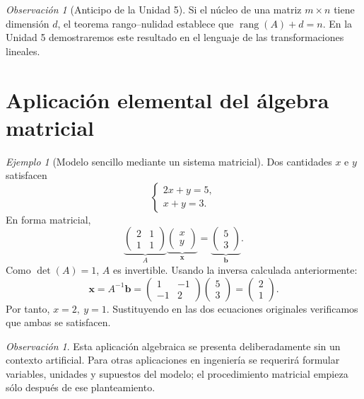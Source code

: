 \documentclass[12pt]{article}
\theoremstyle{remark}
\newtheorem{observacion}[definicion]{Observación}
\newtheorem{ejemplo}[definicion]{Ejemplo}
\newcommand{\rang}{\operatorname{rang}}
\newcommand{\vect}[1]{\boldsymbol{#1}}
\begin{document}
\begin{observacion}[Anticipo de la Unidad 5]
Si el núcleo de una matriz $m\times n$ tiene dimensión $d$, el teorema rango--nulidad establece que $\rang(A)+d=n$. En la Unidad 5 demostraremos este resultado en el lenguaje de las transformaciones lineales.
\end{observacion}

\section{Aplicación elemental del álgebra matricial}
\begin{ejemplo}[Modelo sencillo mediante un sistema matricial]
Dos cantidades $x$ e $y$ satisfacen
\[
\begin{cases}2x+y=5,\\x+y=3.\end{cases}
\]
En forma matricial,
\[
\underbrace{\begin{pmatrix}2&1\\1&1\end{pmatrix}}_{A}
\underbrace{\begin{pmatrix}x\\y\end{pmatrix}}_{\vect{x}}
=\underbrace{\begin{pmatrix}5\\3\end{pmatrix}}_{\vect{b}}.
\]
Como $\det(A)=1$, $A$ es invertible. Usando la inversa calculada anteriormente:
\[
\vect{x}=A^{-1}\vect{b}=
\begin{pmatrix}1&-1\\-1&2\end{pmatrix}
\begin{pmatrix}5\\3\end{pmatrix}
=\begin{pmatrix}2\\1\end{pmatrix}.
\]
Por tanto, $\boxed{x=2,\ y=1}$. Sustituyendo en las dos ecuaciones originales verificamos que ambas se satisfacen.
\end{ejemplo}

\begin{observacion}
Esta aplicación algebraica se presenta deliberadamente sin un contexto artificial. Para otras aplicaciones en ingeniería se requerirá formular variables, unidades y supuestos del modelo; el procedimiento matricial empieza sólo después de ese planteamiento.
\end{observacion}
\end{document}
